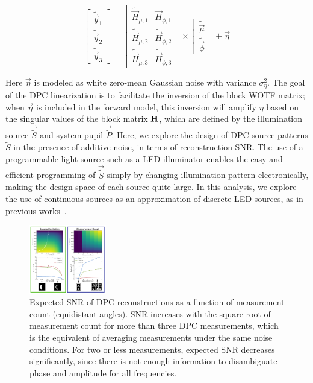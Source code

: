 \begin{equation}
    \label{eq:dpc_forward_model_noise}
    \begin{bmatrix}\tilde{\vec{y}}_1 \\ \tilde{\vec{y}}_2 \\ \tilde{\vec{y}}_3\end{bmatrix} = \begin{bmatrix}\tilde{\vec{H}}_{\mu, 1} & \tilde{\vec{H}}_{\phi, 1}\\ \tilde{\vec{H}}_{\mu, 2} & \tilde{\vec{H}}_{\phi, 2} \\ \tilde{\vec{H}}_{\mu, 3} & \tilde{\vec{H}}_{\phi, 3}\end{bmatrix} \times \begin{bmatrix}\tilde{\vec{\mu}} \\ \tilde{\vec{\phi}}\end{bmatrix} + \vec{\eta}
\end{equation}

\noindent Here $\vec{\eta}$ is modeled as white zero-mean Gaussian noise with variance $\sigma_{\eta}^2$. The goal of the DPC linearization is to facilitate the inversion of the block WOTF matrix; when $\vec{\eta}$ is included in the forward model, this inversion will amplify $\eta$ based on the singular values of the block matrix $\mathbf{H}$, which are defined by the illumination source $\vec{\tilde{S}}$ and system pupil $\vec{\tilde{P}}$. Here, we explore the design of DPC source patterns $\tilde{S}$ in the presence of additive noise, in terms of reconstruction SNR. The use of a programmable light source such as a LED illuminator enables the easy and efficient programming of $\vec{\tilde{S}}$ simply by changing illumination pattern electronically, making the design space of each source quite large. In this analysis, we explore the use of continuous sources as an approximation of discrete LED sources, as in previous works~\cite{tian2015quantitative, Phillips:17}.

\begin{figure}
  \label{fig:phase:dpc_measurement_count}
    \includegraphics[width=0.3\textwidth]{figures/fig_phase_dpc_optimization_meas.pdf}
  \caption{Expected SNR of DPC reconstructions as a function of measurement count (equidistant angles). SNR increases with the square root of measurement count for more than three DPC measurements, which is the equivalent of averaging measurements under the same noise conditions. For two or less measurements, expected SNR decreases significantly, since there is not enough information to disambiguate phase and amplitude for all frequencies.}
\end{figure}

